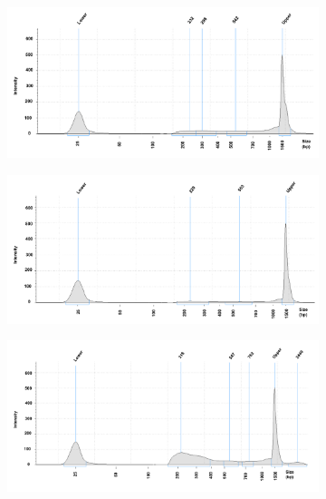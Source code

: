 \begin{figure}[htbp]
\centering
\begin{subfigure}{0.70\textwidth}
\centering
\includegraphics[width=\textwidth]{./Appendix/pdfs/Chapter3/FAST_ATAC_skin_tapestation_C1}
\caption{\textbf{}}
\end{subfigure}
\begin{subfigure}{0.60\textwidth}
\centering
\includegraphics[width=\textwidth]{./Appendix/pdfs/Chapter3/FAST_ATAC_skin_tapestation_C3}
\caption{\textbf{}}
\end{subfigure}
\begin{subfigure}{0.60\textwidth}
\centering
\includegraphics[width=\textwidth]{./Appendix/pdfs/Chapter3/FAST_ATAC_skin_tapestation_C4}

\end{subfigure}
\end{figure}
